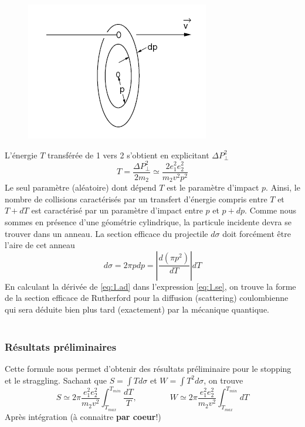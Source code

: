 	\begin{figure}
	\vspace{-10mm}
	\includegraphics[scale=0.55]{ch1/image8.png}
	\end{figure}
L'énergie $T$ transférée de 1 vers 2 s'obtient en explicitant $\Delta P_\perp^2$
\begin{equation}
T=\frac{\Delta P_\perp^2}{2m_2}\simeq \frac{2e_1^2e_2^2}{m_2v^2p^2}
\label{eq:1.ad}
\end{equation}
Le seul paramètre (aléatoire) dont dépend $T$ est le paramètre d'impact $p$. Ainsi, le nombre
de collisions caractérisés par un transfert d'énergie compris entre $T$ et $T+dT$ est caractérisé
par un paramètre d'impact entre $p$ et $p+dp$. Comme nous sommes en présence d'une géométrie
cylindrique, la particule incidente devra se trouver dans un anneau. La section efficace du 
projectile $d\sigma$ doit forcément être l'aire de cet anneau
\begin{equation}
d\sigma=2\pi pdp=\left|\frac{d(\pi p^2)}{dT}\right| dT
\label{eq:1.se}
\end{equation}
En calculant la dérivée de \eqref{eq:1.ad} dans l'expression \eqref{eq:1.se}, on trouve 
la forme de la section efficace de Rutherford pour la diffusion (scattering) coulombienne qui 
sera déduite bien plus tard (exactement) par la mécanique quantique.\ \\

\ \\

\subsubsection{Résultats préliminaires}
Cette formule nous permet d'obtenir des résultats préliminaire pour le stopping et le 
straggling. Sachant que $S = \int Td\sigma$ et $W = \int T^2d\sigma$, on trouve
\begin{equation}
S\simeq 2\pi \frac{e_1^2e_2^2}{m_2v^2}\int_{T_{max}}^{T_{min}}\frac{dT}{T},\qquad\qquad
W\simeq 2\pi \frac{e_1^2e_2^2}{m_2v^2} \int_{T_{max}}^{T_{min}}dT
\end{equation}
Après intégration (à connaitre \textbf{par coeur}!)\ \\

